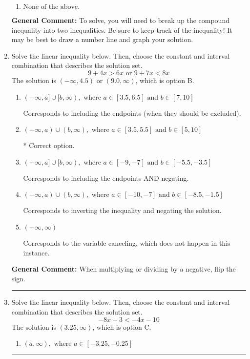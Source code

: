 \documentclass{extbook}[14pt]
\newcommand{\litem}[1]{\item #1

\rule{\textwidth}{0.4pt}}
\begin{document}
\begin{enumerate}
{\begin{enumerate}[label=\Alph*.]
$(-\infty, -30.00) \cup [-3.86, \infty)$, which corresponds to displaying the and-inequality as an or-inequality.
\item \( \text{None of the above.} \)


\end{enumerate}

\textbf{General Comment:} To solve, you will need to break up the compound inequality into two inequalities. Be sure to keep track of the inequality! It may be best to draw a number line and graph your solution.
}
\litem{
Solve the linear inequality below. Then, choose the constant and interval combination that describes the solution set.
\[ 9 + 4 x > 6 x \text{ or } 9 + 7 x < 8 x \]The solution is \( (-\infty, 4.5) \text{ or } (9.0, \infty) \), which is option B.\begin{enumerate}[label=\Alph*.]
\item \( (-\infty, a] \cup [b, \infty), \text{ where } a \in [3.5, 6.5] \text{ and } b \in [7, 10] \)

Corresponds to including the endpoints (when they should be excluded).
\item \( (-\infty, a) \cup (b, \infty), \text{ where } a \in [3.5, 5.5] \text{ and } b \in [5, 10] \)

 * Correct option.
\item \( (-\infty, a] \cup [b, \infty), \text{ where } a \in [-9, -7] \text{ and } b \in [-5.5, -3.5] \)

Corresponds to including the endpoints AND negating.
\item \( (-\infty, a) \cup (b, \infty), \text{ where } a \in [-10, -7] \text{ and } b \in [-8.5, -1.5] \)

Corresponds to inverting the inequality and negating the solution.
\item \( (-\infty, \infty) \)

Corresponds to the variable canceling, which does not happen in this instance.
\end{enumerate}

\textbf{General Comment:} When multiplying or dividing by a negative, flip the sign.
}
\litem{
Solve the linear inequality below. Then, choose the constant and interval combination that describes the solution set.
\[ -8x + 3 < -4x -10 \]The solution is \( (3.25, \infty) \), which is option C.\begin{enumerate}[label=\Alph*.]
\item \( (a, \infty), \text{ where } a \in [-3.25, -0.25] \)


\end{enumerate}}
\end{enumerate}
\end{document}
